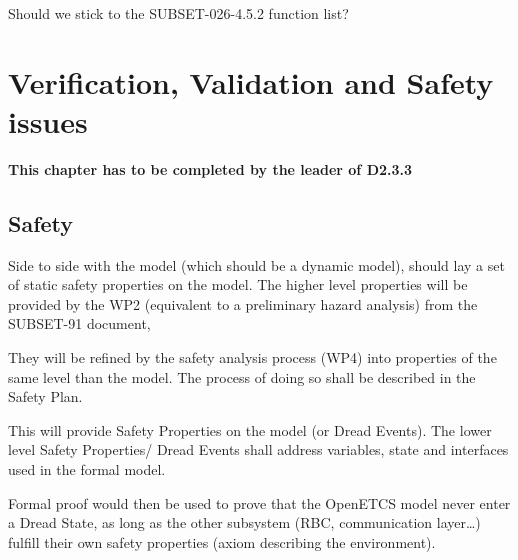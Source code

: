 \documentclass{template/openetcs_article}
\begin{document}



\begin{issue}
Should we stick to the SUBSET-026-4.5.2 function list?
\end{issue}





\section{Verification, Validation and Safety issues}
\textbf{This chapter has to be completed by the leader of D2.3.3}
\subsection{Safety}
\label{safety}
\begin{justif}
Side to side with the model (which should be a dynamic model), should lay a set of  
static safety properties on the model. The higher level properties will be provided 
by the WP2 (equivalent to a preliminary hazard analysis) from the SUBSET-91 document, 

They will be refined by the safety analysis process (WP4) into properties of the same 
level than the model. The process of doing so shall be described in the Safety Plan.

This will provide Safety Properties on the model (or Dread Events). The lower level Safety Properties/
Dread Events shall address variables, state and interfaces used in the formal model.

Formal proof would then be used to prove that the OpenETCS model never enter a Dread State, 
as long as the other subsystem (RBC, communication layer\dots) fulfill their own safety properties
(axiom describing the environment).
\end{justif}
\end{document}
